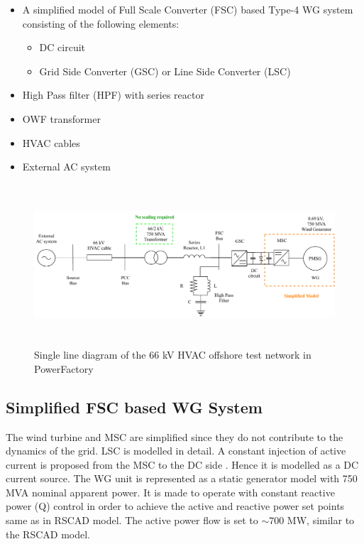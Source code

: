 \begin{itemize}
    \item A simplified model of Full Scale Converter (\gls{FSC}) based Type-4 \gls{WG} system consisting of the following elements:
    \begin{itemize}
        \item \gls{DC} circuit
        \item Grid Side Converter (\gls{GSC}) or Line Side Converter (\gls{LSC})
    \end{itemize}
    \item High Pass filter (\gls{HPF}) with series reactor
    \item \gls{OWF} transformer
    \item \gls{HVAC} cables  
    \item External \gls{AC} system
\end{itemize}

\begin{figure}[H]
    \includegraphics[height = 6cm,width = \textwidth]{Diagrams/Chapter_3/WT1_AC_PFD.pdf}
    \caption{Single line diagram of the 66 kV HVAC offshore test network in PowerFactory}
    \label{fig:WT1_Model_PFD_comp}
\end{figure}

\subsection{Simplified FSC based WG System}\label{simplified_FSC_WG}
The wind turbine and \gls{MSC} are simplified since they do not contribute to the dynamics of the grid. \gls{LSC} is modelled in detail. A constant injection of active current is proposed from the \gls{MSC} to the \gls{DC} side \cite{korai_dynamic_2019}. Hence it is modelled as a \gls{DC} current source. The \gls{WG} unit is represented as a static generator model with 750 MVA nominal apparent power. It is made to operate with constant reactive power (Q) control in order to achieve the active and reactive power set points same as in RSCAD model. The active power flow is set to $\sim{700}$ MW, similar to the RSCAD model.

